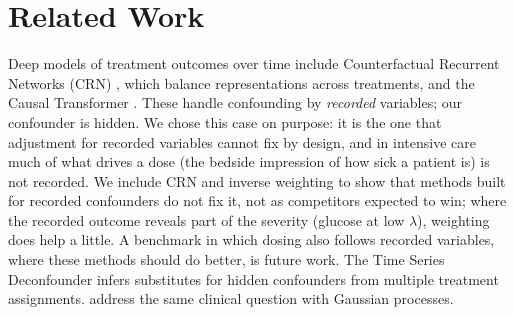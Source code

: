\documentclass[letterpaper]{article}
\begin{document}
\medskip
\noindent{}
\medskip

\section{Related Work}

Deep models of treatment outcomes over time include Counterfactual Recurrent Networks (CRN) \citep{bica2020crn}, which balance representations across treatments, and the Causal Transformer \citep{melnychuk2022causal}. These handle confounding by \emph{recorded} variables; our confounder is hidden. We chose this case on purpose: it is the one that adjustment for recorded variables cannot fix by design, and in intensive care much of what drives a dose (the bedside impression of how sick a patient is) is not recorded. We include CRN and inverse weighting to show that methods built for recorded confounders do not fix it, not as competitors expected to win; where the recorded outcome reveals part of the severity (glucose at low $\lambda$), weighting does help a little. A benchmark in which dosing also follows recorded variables, where these methods should do better, is future work. The Time Series Deconfounder \citep{bica2020deconfounder} infers substitutes for hidden confounders from multiple treatment assignments. \citet{soleimani2017treatment} address the same clinical question with Gaussian processes.
\end{document}
